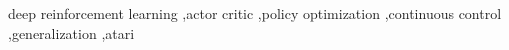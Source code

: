 \begin{abstract}

\end{abstract}

\begin{keyword}
deep reinforcement learning \sep actor critic \sep policy optimization \sep continuous control \sep generalization \sep atari 
\end{keyword}
